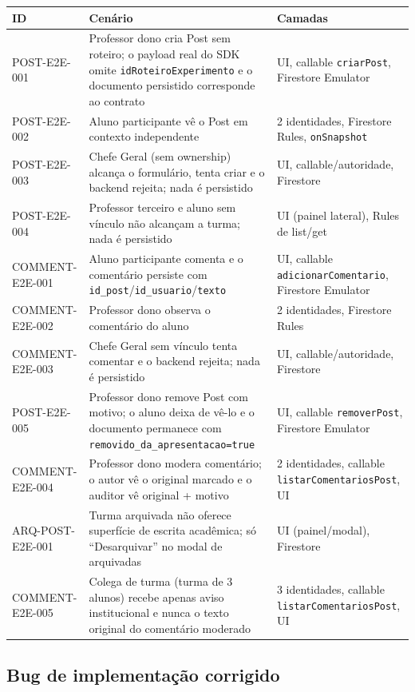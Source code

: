 \begin{longtable}{@{}p{}p{}p{}@{}}
\toprule
ID & Cenário & Camadas \\
\midrule
\endhead
POST-E2E-001 & Professor dono cria Post sem roteiro; o payload real do SDK
  omite \texttt{idRoteiroExperimento} e o documento persistido corresponde ao
  contrato & UI, callable \texttt{criarPost}, Firestore Emulator \\
POST-E2E-002 & Aluno participante vê o Post em contexto independente &
  2 identidades, Firestore Rules, \texttt{onSnapshot} \\
POST-E2E-003 & Chefe Geral (sem ownership) alcança o formulário, tenta criar e
  o backend rejeita; nada é persistido & UI, callable/autoridade, Firestore \\
POST-E2E-004 & Professor terceiro e aluno sem vínculo não alcançam a turma;
  nada é persistido & UI (painel lateral), Rules de list/get \\
COMMENT-E2E-001 & Aluno participante comenta e o comentário persiste com
  \texttt{id\_post}/\texttt{id\_usuario}/\texttt{texto} & UI, callable
  \texttt{adicionarComentario}, Firestore Emulator \\
COMMENT-E2E-002 & Professor dono observa o comentário do aluno &
  2 identidades, Firestore Rules \\
COMMENT-E2E-003 & Chefe Geral sem vínculo tenta comentar e o backend rejeita;
  nada é persistido & UI, callable/autoridade, Firestore \\
POST-E2E-005 & Professor dono remove Post com motivo; o aluno deixa de vê-lo e o
  documento permanece com \texttt{removido\_da\_apresentacao=true} &
  UI, callable \texttt{removerPost}, Firestore Emulator \\
COMMENT-E2E-004 & Professor dono modera comentário; o autor vê o original
  marcado e o auditor vê original + motivo & 2 identidades, callable
  \texttt{listarComentariosPost}, UI \\
ARQ-POST-E2E-001 & Turma arquivada não oferece superfície de escrita acadêmica;
  só ``Desarquivar'' no modal de arquivadas & UI (painel/modal), Firestore \\
COMMENT-E2E-005 & Colega de turma (turma de 3 alunos) recebe apenas aviso
  institucional e nunca o texto original do comentário moderado &
  3 identidades, callable \texttt{listarComentariosPost}, UI \\
\bottomrule
\end{longtable}

\subsection{Bug de implementação corrigido}

